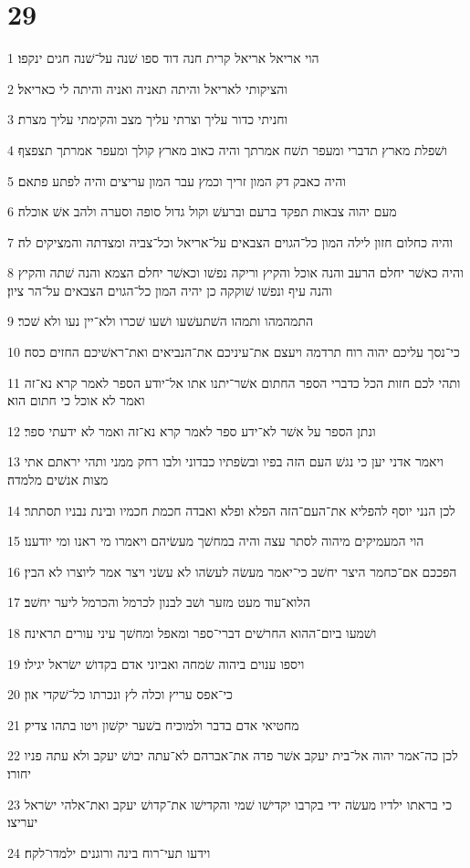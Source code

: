 \chapter{29}

\par 1 הוי אריאל אריאל קרית חנה דוד ספו שׁנה על־שׁנה חגים ינקפו׃
\par 2 והציקותי לאריאל והיתה תאניה ואניה והיתה לי כאריאל׃
\par 3 וחניתי כדור עליך וצרתי עליך מצב והקימתי עליך מצרת׃
\par 4 ושׁפלת מארץ תדברי ומעפר תשׁח אמרתך והיה כאוב מארץ קולך ומעפר אמרתך תצפצף׃
\par 5 והיה כאבק דק המון זריך וכמץ עבר המון עריצים והיה לפתע פתאם׃
\par 6 מעם יהוה צבאות תפקד ברעם וברעשׁ וקול גדול סופה וסערה ולהב אשׁ אוכלה׃
\par 7 והיה כחלום חזון לילה המון כל־הגוים הצבאים על־אריאל וכל־צביה ומצדתה והמציקים לה׃
\par 8 והיה כאשׁר יחלם הרעב והנה אוכל והקיץ וריקה נפשׁו וכאשׁר יחלם הצמא והנה שׁתה והקיץ והנה עיף ונפשׁו שׁוקקה כן יהיה המון כל־הגוים הצבאים על־הר ציון׃
\par 9 התמהמהו ותמהו השׁתעשׁעו ושׁעו שׁכרו ולא־יין נעו ולא שׁכר׃
\par 10 כי־נסך עליכם יהוה רוח תרדמה ויעצם את־עיניכם את־הנביאים ואת־ראשׁיכם החזים כסה׃
\par 11 ותהי לכם חזות הכל כדברי הספר החתום אשׁר־יתנו אתו אל־יודע הספר לאמר קרא נא־זה ואמר לא אוכל כי חתום הוא׃
\par 12 ונתן הספר על אשׁר לא־ידע ספר לאמר קרא נא־זה ואמר לא ידעתי ספר׃
\par 13 ויאמר אדני יען כי נגשׁ העם הזה בפיו ובשׂפתיו כבדוני ולבו רחק ממני ותהי יראתם אתי מצות אנשׁים מלמדה׃
\par 14 לכן הנני יוסף להפליא את־העם־הזה הפלא ופלא ואבדה חכמת חכמיו ובינת נבניו תסתתר׃
\par 15 הוי המעמיקים מיהוה לסתר עצה והיה במחשׁך מעשׂיהם ויאמרו מי ראנו ומי יודענו׃
\par 16 הפככם אם־כחמר היצר יחשׁב כי־יאמר מעשׂה לעשׂהו לא עשׂני ויצר אמר ליוצרו לא הבין׃
\par 17 הלוא־עוד מעט מזער ושׁב לבנון לכרמל והכרמל ליער יחשׁב׃
\par 18 ושׁמעו ביום־ההוא החרשׁים דברי־ספר ומאפל ומחשׁך עיני עורים תראינה׃
\par 19 ויספו ענוים ביהוה שׂמחה ואביוני אדם בקדושׁ ישׂראל יגילו׃
\par 20 כי־אפס עריץ וכלה לץ ונכרתו כל־שׁקדי און׃
\par 21 מחטיאי אדם בדבר ולמוכיח בשׁער יקשׁון ויטו בתהו צדיק׃
\par 22 לכן כה־אמר יהוה אל־בית יעקב אשׁר פדה את־אברהם לא־עתה יבושׁ יעקב ולא עתה פניו יחורו׃
\par 23 כי בראתו ילדיו מעשׂה ידי בקרבו יקדישׁו שׁמי והקדישׁו את־קדושׁ יעקב ואת־אלהי ישׂראל יעריצו׃
\par 24 וידעו תעי־רוח בינה ורוגנים ילמדו־לקח׃

